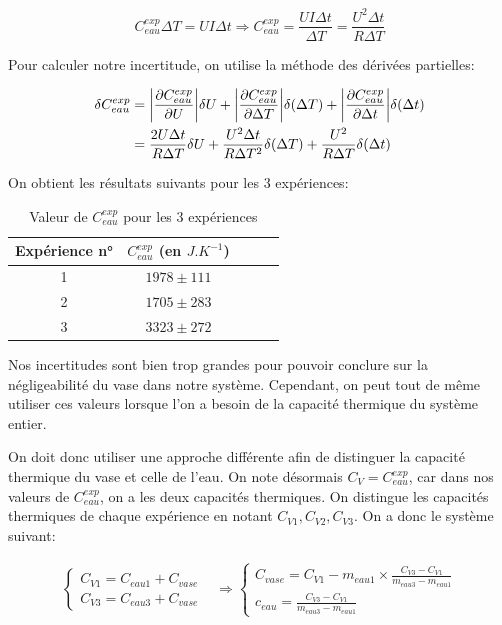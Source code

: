 \documentclass[12pt]{article}
\begin{document}
\begin{equation}
	C_{eau}^{exp} \Delta T = U I \Delta t \Rightarrow C_{eau}^{exp} = \frac{U I \Delta t}{\Delta T} = \frac{U^2\Delta t}{R \Delta T}
\end{equation}

\newpage
Pour calculer notre incertitude, on utilise la méthode des dérivées partielles:

\begin{align*}
	\delta C_{eau}^{exp} & = \abs{\frac{\partial C_{eau}^{exp}}{\partial U}} \delta U + \abs{\frac{\partial C_{eau}^{exp}}{\partial \Delta T}} \delta (\Delta T) + \abs{\frac{\partial C_{eau}^{exp}}{\partial \Delta t}} \delta (\Delta t)\\
	& = \frac{2U \Delta t}{R \Delta T} \delta U + \frac{U^2 \Delta t}{R \Delta T ^2} \delta (\Delta T) + \frac{U^2}{R \Delta T} \delta (\Delta t)\\
\end{align*}

On obtient les résultats suivants pour les 3 expériences:
\begin{table}[h!]
	\begin{center}
		\begin{tabular}{|c|c|c|c|c|}
			\hline
			Expérience n° & $C_{eau}^{exp}$ (en $J.K^{-1}$) \\ \hline
			1 & $1978 \pm 111$ \\
			2 & $1705 \pm 283$ \\
			3 & $3323 \pm 272$ \\ \hline
		\end{tabular}
	\end{center}
	\caption{Valeur de $C_{eau}^{exp}$ pour les 3 expériences}
\end{table}

Nos incertitudes sont bien trop grandes pour pouvoir conclure sur la négligeabilité du vase dans notre système.
Cependant, on peut tout de même utiliser ces valeurs lorsque l'on a besoin de la capacité thermique du système entier.

On doit donc utiliser une approche différente afin de distinguer la capacité thermique du vase et celle de l'eau. On note désormais $C_V = C_{eau}^{exp}$, car dans nos valeurs de $C_{eau}^{exp}$, 
on a les deux capacités thermiques. On distingue les capacités thermiques de chaque expérience en notant $C_{V1}, C_{V2}, C_{V3}$. On a donc le système suivant:

\begin{align*}
	\begin{cases}
		C_{V1}=C_{eau1}+C_{vase} \\
		C_{V3}=C_{eau3}+C_{vase}
	\end{cases} 
&\Rightarrow 
	\begin{cases}
		C_{vase}= C_{V1} - m_{eau1} \times \frac{C_{V3}-C_{V1}}{m_{eau3} - m_{eau1}} \\
		c_{eau} = \frac{C_{V3}-C_{V1}}{m_{eau3} - m_{eau1}}
	\end{cases}
\end{align*}
\end{document}
